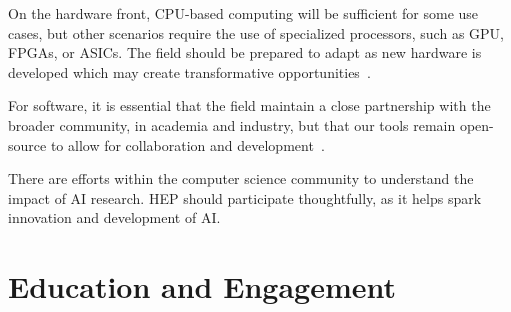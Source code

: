 \documentclass[submission,Phys]{SciPost}
\begin{document}
On the hardware front, CPU-based computing will be sufficient for some use cases, but other scenarios require the use of specialized processors, such as GPU, FPGAs, or ASICs. The field should be prepared to adapt as new hardware is developed which may create transformative opportunities~\cite{Harris:2022qtm}. 

For software, it is essential that the field maintain a close partnership with the broader community, in academia and industry, but that our tools remain open-source to allow for collaboration and development~\cite{campana2022hep,Kahn:2022kae}.

There are efforts within the computer science community to understand the impact of AI research. HEP should participate thoughtfully, as it helps spark innovation and development of AI.
    

\section{Education and Engagement}
\label{sec:education}

\begin{comment}
\begin{itemize}
    \item Pipeline development: Undergraduate/grad courses at the intersection of DS, ML and physics, involving open software and data used in HEP
    \item Postdoc retention: Important to offer career paths at intersection of ML and physics to retain talented early-career researchers, given overlap with industry careers \cite{Boyda:2022nmh}
    \item Can be difficult to navigate intersection with industry i.e., engagement of those outside our community in our problems, often NDA for collaboration at odds with open science
    \item Innovation-driven developments, primarily by young researchers, can't be concentrated in national labs but must support engagement and development at universities also
    \item Encourage engagement through public data sets and e.g., competitions, examples in Ref. ~\cite{Dvorkin:2022pwo}
\end{itemize}
\end{comment}
\end{document}
